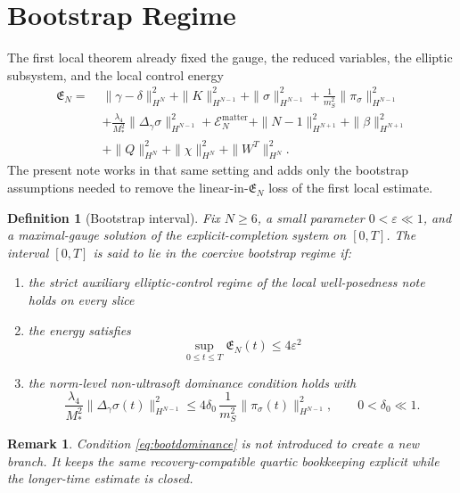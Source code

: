 \documentclass[11pt]{article}
\newtheorem{definition}{Definition}
\newtheorem{remark}{Remark}
\begin{document}
\section{Bootstrap Regime}

The first local theorem already fixed the gauge, the reduced variables, the elliptic subsystem, and the local control energy
\begin{align}
\mathfrak E_N
=\;&
\|\gamma-\delta\|_{H^N}^2
+\|K\|_{H^{N-1}}^2
+\|\sigma\|_{H^{N-1}}^2
+\frac{1}{m_S^2}\|\pi_\sigma\|_{H^{N-1}}^2
\nonumber\\
&+
\frac{\lambda_4}{M_*^2}\|\Delta_\gamma\sigma\|_{H^{N-1}}^2
+\mathcal E_N^{\mathrm{matter}}
+\|N-1\|_{H^{N+1}}^2
+\|\beta\|_{H^{N+1}}^2
\nonumber\\
&+
\|Q\|_{H^N}^2
+\|\chi\|_{H^N}^2
+\|W^T\|_{H^N}^2.
\label{eq:EN}
\end{align}
The present note works in that same setting and adds only the bootstrap assumptions needed to remove the linear-in-\(\mathfrak E_N\) loss of the first local estimate.

\begin{definition}[Bootstrap interval]
Fix \(N\ge 6\), a small parameter \(0<\varepsilon\ll 1\), and a maximal-gauge solution of the explicit-completion system on \([0,T]\). The interval \([0,T]\) is said to lie in the \emph{coercive bootstrap regime} if:
\begin{enumerate}
    \item the strict auxiliary elliptic-control regime of the local well-posedness note holds on every slice
    \item the energy satisfies
    \begin{equation}
    \sup_{0\le t\le T}\mathfrak E_N(t)\le 4\varepsilon^2
    \label{eq:bootenergy}
    \end{equation}
    \item the norm-level non-ultrasoft dominance condition holds with
    \begin{equation}
    \frac{\lambda_4}{M_*^2}\|\Delta_\gamma\sigma(t)\|_{H^{N-1}}^2
    \le
    4\delta_0\,
    \frac{1}{m_S^2}\|\pi_\sigma(t)\|_{H^{N-1}}^2,
    \qquad
    0<\delta_0\ll 1.
    \label{eq:bootdominance}
    \end{equation}
\end{enumerate}
\end{definition}

\begin{remark}
Condition \eqref{eq:bootdominance} is not introduced to create a new branch. It keeps the same recovery-compatible quartic bookkeeping explicit while the longer-time estimate is closed.
\end{remark}
\end{document}
